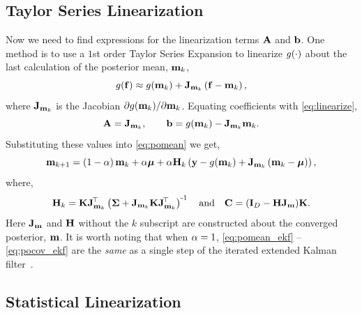 \documentclass{article} %
\begin{document}
\subsection{Taylor Series Linearization}

Now we need to find expressions for the linearization terms $\mathbf{A}$ and
$\mathbf{b}$. One method is to use a $1$st order Taylor Series Expansion to 
linearize $g\!\left({{\cdot}}\right)$ about the last calculation of the posterior mean, 
$\mathbf{m}_k$,
\begin{equation}
    g\!\left({{\mathbf{f}}}\right) \approx g\!\left({{\mathbf{m}_k}}\right) +
    \mathbf{J}_{\mathbf{m}_k}\left({\mathbf{f} - \mathbf{m}_k}\right),
\end{equation}
where $\mathbf{J}_{\mathbf{m}_k}$ is the Jacobian $\partial g\!\left({{\mathbf{m}_k}}\right)\!/ 
\partial\mathbf{m}_k$. Equating coefficients with \eqref{eq:linearize},
\begin{equation}
    \mathbf{A} = \mathbf{J}_{\mathbf{m}_k}, \qquad \mathbf{b} = g\!\left({{\mathbf{m}_k}}\right) -
    \mathbf{J}_{\mathbf{m}_k}\mathbf{m}_k.
\end{equation}
Substituting these values into \eqref{eq:pomean} we get,
\begin{equation}
    \mathbf{m}_{k+1} = \left({1-\alpha}\right)\mathbf{m}_k + \alpha\boldsymbol{\mu} 
        + \alpha\mathbf{H}_k\left({\mathbf{y} - g\!\left({{\mathbf{m}_k}}\right) 
        + \mathbf{J}_{\mathbf{m}_k}\left({\mathbf{m}_k - \boldsymbol{\mu}}\right)}\right),
    \label{eq:pomean_ekf}
\end{equation}
where,
\begin{equation}
    \mathbf{H}_k = \mathbf{K}\mathbf{J}_{\mathbf{m}_k}^{\!\top}\left({\boldsymbol{\Sigma} +
        \mathbf{J}_{\mathbf{m}_k}\mathbf{K}\mathbf{J}_{\mathbf{m}_k}^{\!\top}}\right)^{\text{-}1}
    \quad\text{and}\quad
    \mathbf{C} = \left({\mathbf{I}_{D} - \mathbf{H}\mathbf{J}_{\mathbf{m}}}\right)\!\mathbf{K}.
    \label{eq:pocov_ekf}
\end{equation}
Here $\mathbf{J}_{\mathbf{m}}$ and $\mathbf{H}$ without the $k$ subscript are constructed
about the converged posterior, $\mathbf{m}$. It is worth noting that when $\alpha =
1$, \eqref{eq:pomean_ekf} -- \eqref{eq:pocov_ekf} are the \emph{same} as a
single step of the iterated extended Kalman filter~\cite{Bell1993, Sibley2006}.


\subsection{Statistical Linearization}
\end{document}
